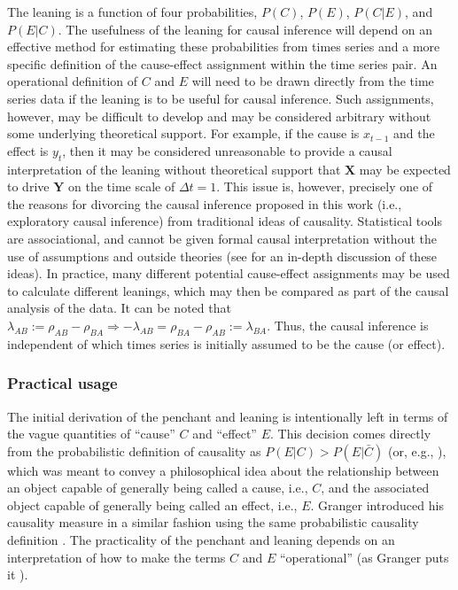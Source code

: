 \documentclass{article}[10pt]
\begin{document}
The leaning is a function of four probabilities, $P(C)$, $P(E)$, $P(C|E)$, and $P(E|C)$.  The usefulness of the leaning for causal inference will depend on an effective method for estimating these probabilities from times series and a more specific definition of the cause-effect assignment within the time series pair.  An operational definition of $C$ and $E$ will need to be drawn directly from the time series data if the leaning is to be useful for causal inference.  Such assignments, however, may be difficult to develop and may be considered arbitrary without some underlying theoretical support.  For example, if the cause is $x_{t-1}$ and the effect is $y_{t}$, then it may be considered unreasonable to provide a causal interpretation of the leaning without theoretical support that $\mathbf{X}$ may be expected to drive $\mathbf{Y}$ on the time scale of $\Delta t=1$.  This issue is, however, precisely one of the reasons for divorcing the causal inference proposed in this work (i.e., exploratory causal inference) from traditional ideas of causality.  Statistical tools are associational, and cannot be given formal causal interpretation without the use of assumptions and outside theories (see \cite{Illari2014} for an in-depth discussion of these ideas).  In practice, many different potential cause-effect assignments may be used to calculate different leanings, which may then be compared as part of the causal analysis of the data.  It can be noted that $\lambda_{AB} := \rho_{AB} - \rho_{BA}\Rightarrow -\lambda_{AB} = \rho_{BA} - \rho_{AB} := \lambda_{BA}$.  Thus, the causal inference is independent of which times series is initially assumed to be the cause (or effect).

\subsubsection{Practical usage}
The initial derivation of the penchant and leaning is intentionally left in terms of the vague quantities of ``cause'' $C$ and ``effect'' $E$.  This decision comes directly from the probabilistic definition of causality as $P(E|C)>P(E|\bar{C})$ \cite{Suppes1970} (or, e.g., \cite{Illari2014}), which was meant to convey a philosophical idea about the relationship between an object capable of generally being called a cause, i.e., $C$, and the associated object capable of generally being called an effect, i.e., $E$.   Granger introduced his causality measure in a similar fashion using the same probabilistic causality definition \cite{Granger1980}.  The practicality of the penchant and leaning depends on an interpretation of how to make the terms $C$ and $E$ ``operational'' (as Granger puts it \cite{Granger1980}).  
\end{document}
